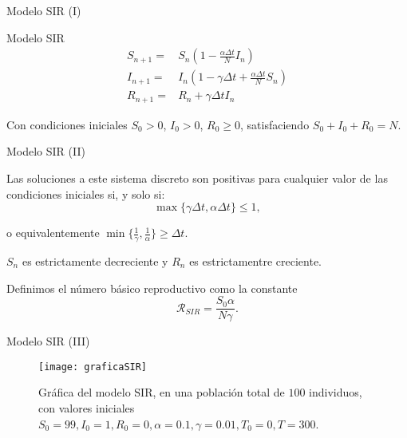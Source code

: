 \begin{frame}{Modelo SIR (I)}

    \begin{block}{Modelo SIR}
        \begin{equation}
        \label{eqn: SIR_modelo}
        \begin{aligned}
        S_{n+1} = & S_n \left(1-\frac{\alpha\Delta t}{N} I_n \right) \\
        I_{n+1} = & I_n \left( 1-\gamma \Delta t + \frac{\alpha\Delta t}{N} S_n \right) \\
        R_{n+1} = & R_n + \gamma \Delta t I_n
        \end{aligned}
        \end{equation}
        
        Con condiciones iniciales $S_0>0$, $I_0>0$, $R_0\geq 0$, satisfaciendo $S_0+I_0+R_0=N$.
    \end{block}
\end{frame}


\begin{frame}{Modelo SIR (II)}
    \begin{proposition}
        Las soluciones a este sistema discreto son positivas para cualquier valor de las condiciones iniciales si, y solo si:
        $$\max{\big\{\gamma\Delta t, \alpha\Delta t\big\} } \leq 1,$$
        
        o equivalentemente  
        $\min{\bigg\{ \frac{1}{\gamma}, \frac{1}{\alpha} \bigg\} } \geq \Delta t.$
        
        \end{proposition}

        \pause 

        \begin{lema}
            $S_n$ es estrictamente decreciente y $R_n$ es estrictamentre creciente.
        \end{lema}

        \pause

        \begin{definition}
            Definimos el número básico reproductivo como la constante 
            $$\mathcal{R}_{SIR}=\frac{S_0 \alpha}{N\gamma }.$$
        \end{definition}


\end{frame}

\begin{frame}{Modelo SIR (III)}
    \begin{figure}
        \begin{center}
        \caption{Gráfica del modelo SIR, en una población total de $100$ individuos, con valores iniciales $S_0=99, I_0 = 1, R_0 = 0, \alpha = 0.1, \gamma = 0.01, T_0 = 0, T = 300$.}
        \texttt{[image: graficaSIR]}
        \end{center}
    \end{figure}
\end{frame}

